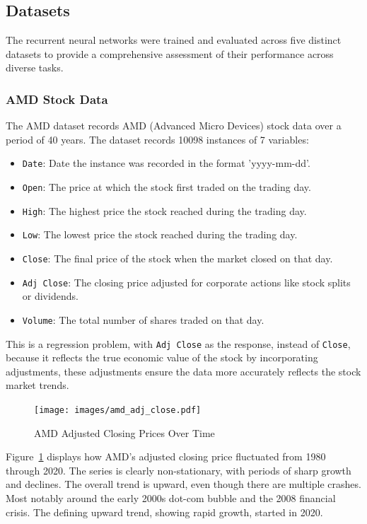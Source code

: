 \documentclass[conference]{IEEEtran}
\begin{document}
\subsection{\textbf{Datasets}}

The recurrent neural networks were trained and evaluated across five distinct datasets to provide a comprehensive assessment of their performance across diverse tasks.

\subsubsection{\textbf{AMD Stock Data}}

The AMD dataset records AMD (Advanced Micro Devices) stock data over a period of 40 years. The dataset records 10098 instances of 7 variables:

\begin{itemize}
    \item \texttt{Date}: Date the instance was recorded in the format 'yyyy-mm-dd'.
    \item \texttt{Open}: The price at which the stock first traded on the trading day.
    \item \texttt{High}: The highest price the stock reached during the trading day.
    \item \texttt{Low}: The lowest price the stock reached during the trading day.
    \item \texttt{Close}: The final price of the stock when the market closed on that day.
    \item \texttt{Adj Close}: The closing price adjusted for corporate actions like stock splits or dividends.
    \item \texttt{Volume}: The total number of shares traded on that day.
\end{itemize}

This is a regression problem, with \texttt{Adj Close} as the response, instead of \texttt{Close}, because it reflects the true economic value of the stock by incorporating adjustments, these adjustments ensure the data more accurately reflects the stock market trends.

\begin{figure}[H]
    \centering
    \texttt{[image: images/amd\_adj\_close.pdf]}
    \caption{AMD Adjusted Closing Prices Over Time}
    \label{fig:amd_adj_close}
\end{figure}

Figure~\ref{fig:amd_adj_close} displays how AMD's adjusted closing price fluctuated from 1980 through 2020. The series is clearly non-stationary, with periods of sharp growth and declines. The overall trend is upward, even though there are multiple crashes. Most notably around the early 2000s dot-com bubble and the 2008 financial crisis. The defining upward trend, showing rapid growth, started in 2020.
\end{document}
